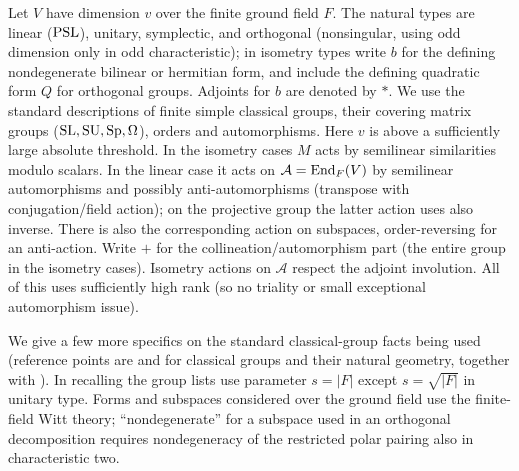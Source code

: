 \begin{convention}\label{c:classical-matrices}
Let \(V\) have dimension \(v\) over the finite ground field \(F\). The natural types are linear (\({\rm PSL}\)), unitary, symplectic, and orthogonal (nonsingular, using odd dimension only in odd characteristic); in isometry types write \(b\) for the defining nondegenerate bilinear or hermitian form, and include the defining quadratic form \(Q\) for orthogonal groups. Adjoints for \(b\) are denoted by \(*\). We use the standard descriptions of finite simple classical groups, their covering matrix groups (\({\rm SL},{\rm SU},{\rm Sp},\Omega\)), orders and automorphisms. Here \(v\) is above a sufficiently large absolute threshold. In the isometry cases \(M\) acts by semilinear similarities modulo scalars. In the linear case it acts on \(\mathcal A={\rm End}_F(V)\) by semilinear automorphisms and possibly anti-automorphisms (transpose with conjugation/field action); on the projective group the latter action uses also inverse. There is also the corresponding action on subspaces, order-reversing for an anti-action. Write \(+\) for the collineation/automorphism part (the entire group in the isometry cases). Isometry actions on \(\mathcal A\) respect the adjoint involution. All of this uses sufficiently high rank (so no triality or small exceptional automorphism issue).

We give a few more specifics on the standard classical-group facts being used (reference points are \citet{Taylor1992} and \citet{KleidmanLiebeck1990} for classical groups and their natural geometry, together with ). In recalling the group lists use parameter \(s=|F|\) except \(s=\sqrt{|F|}\) in unitary type. Forms and subspaces considered over the ground field use the finite-field Witt theory; ``nondegenerate'' for a subspace used in an orthogonal decomposition requires nondegeneracy of the restricted polar pairing also in characteristic two.


\end{convention}
